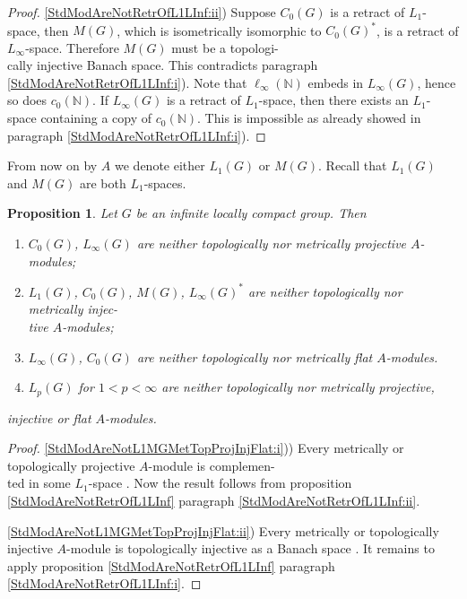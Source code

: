\documentclass{article}
\theoremstyle{plain}
\newtheorem{proposition}{Proposition}[section]
\theoremstyle{definition}
\newtheorem{proof}{Proof}\def\theproof{}
\begin{document}
\begin{fulltext}
\begin{proof}
\ref{StdModAreNotRetrOfL1LInf:ii}) Suppose $C_0(G)$ is a retract of $L_1$-space, then $M(G)$, which is isometrically 
isomorphic to $C_0(G)^*$, is a retract of $L_\infty$-space. Therefore $M(G)$ must be a 
topologi-\\cally injective Banach space. This contradicts paragraph \ref{StdModAreNotRetrOfL1LInf:i}). Note that 
$\ell_\infty(\mathbb{N})$ embeds in $L_\infty(G)$, hence so does $c_0(\mathbb{N})$. If 
$L_\infty(G)$ is a retract of $L_1$-space, then there exists an $L_1$-space containing a 
copy of $c_0(\mathbb{N})$. This is impossible as already showed in paragraph \ref{StdModAreNotRetrOfL1LInf:i}).
\end{proof}

From now on by $A$ we denote either $L_1(G)$ or $M(G)$. Recall that $L_1(G)$ and $M(G)$ 
are both $L_1$-spaces.

\begin{proposition}\label{StdModAreNotL1MGMetTopProjInjFlat} Let $G$ be an infinite 
locally compact group. Then
\begin{enumerate}
    \item $C_0(G)$, $L_\infty(G)$ are neither topologically nor metrically projective $A$-modules;
    \label{StdModAreNotL1MGMetTopProjInjFlat:i}
    \item $L_1(G)$, $C_0(G)$, $M(G)$, $L_\infty(G)^*$ are neither topologically nor metrically 
    injec-\\tive $A$-modules;
    \label{StdModAreNotL1MGMetTopProjInjFlat:ii}
    \item $L_\infty(G)$, $C_0(G)$ are neither topologically nor metrically flat $A$-modules.
    \label{StdModAreNotL1MGMetTopProjInjFlat:iii}
    \item $L_p(G)$ for $1<p<\infty$ are neither topologically nor metrically projective, 
    \label{StdModAreNotL1MGMetTopProjInjFlat:iv}
\end{enumerate}
injective or flat $A$-modules.
\end{proposition}
\begin{proof} \ref{StdModAreNotL1MGMetTopProjInjFlat:i}))
Every metrically or topologically projective $A$-module is complemen-\\ted 
in some $L_1$-space \cite[proposition 3.8]{NemGeomProjInjFlatBanMod}. Now the result follows 
from proposition \ref{StdModAreNotRetrOfL1LInf} paragraph \ref{StdModAreNotRetrOfL1LInf:ii}.

\ref{StdModAreNotL1MGMetTopProjInjFlat:ii}) 
Every metrically or topologically injective $A$-module is topologically injective as a 
Banach space \cite[proposition 3.8]{NemGeomProjInjFlatBanMod}. It remains to apply 
proposition \ref{StdModAreNotRetrOfL1LInf} paragraph \ref{StdModAreNotRetrOfL1LInf:i}.


\end{proof}
\end{fulltext}
\end{document}
